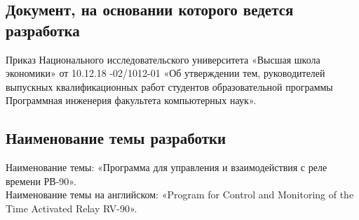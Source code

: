 \subsection{Документ, на основании которого ведется разработка}
Приказ Национального исследовательского университета «Высшая школа экономики» от
10.12.18 -02/1012-01 «Об утверждении тем, руководителей выпускных квалификационных
работ студентов образовательной программы Программная инженерия факультета компьютерных
наук».

\subsection{Наименование темы разработки}
Наименование темы: «Программа для управления и взаимодействия с реле времени РВ-90». \\
Наименование темы на английском: «Program for Control and Monitoring of the Time Activated Relay RV-90». \\


